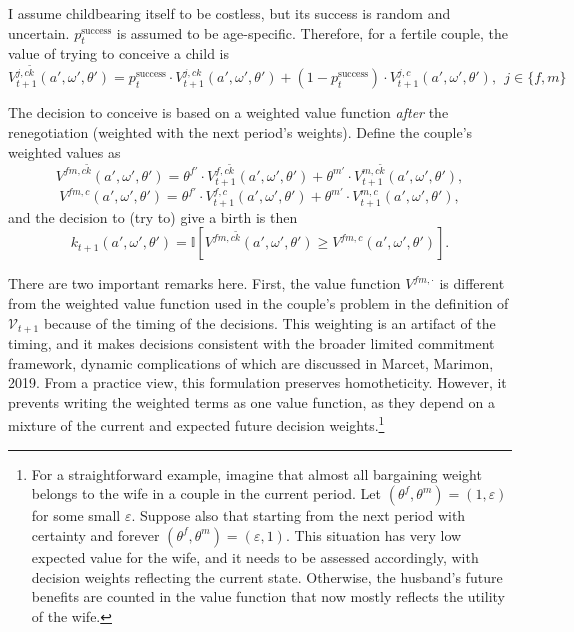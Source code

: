\documentclass[12pt,letter]{article}
\newcommand{\I}{\mathbb{I}}
\begin{document}
I assume childbearing itself to be costless, but its success is random and uncertain. $p_t^{\text{success}}$ is assumed to be age-specific. Therefore, for a fertile couple, the value of trying to conceive a child is
\begin{equation}
V^{j,c\tilde{k}}_{t+1}(a',\omega',\theta') = p_t^{\text{success}}\cdot V^{j,ck}_{t+1}(a',\omega',\theta') + (1-p_t^{\text{success}})\cdot V^{j,c}_{t+1}(a',\omega',\theta'), \ \ j\in\{f,m\}
\end{equation}

The decision to conceive is based on a weighted value function \emph{after} the renegotiation (weighted with the next period's weights). Define the couple's weighted values as
\[V^{fm,c\tilde{k}}(a',\omega',\theta') = \theta^{f\prime} \cdot V^{f,c\tilde{k}}_{t+1}(a',\omega',\theta') + \theta^{m\prime} \cdot V^{m,c\tilde{k}}_{t+1}(a',\omega',\theta'),\]
\[V^{fm,c}(a',\omega',\theta') = \theta^{f\prime} \cdot V^{f,c}_{t+1}(a',\omega',\theta') + \theta^{m\prime} \cdot V^{m,c}_{t+1}(a',\omega',\theta'),\]
and the decision to (try to) give a birth is then
\begin{equation}k_{t+1}(a',\omega',\theta') = \I\left[ V^{fm,c\tilde{k}}(a',\omega',\theta')  \geq V^{fm,c}(a',\omega',\theta')\right].\end{equation}

There are two important remarks here. First, the value function $V^{fm,\cdot}$ is different from the weighted value function used in the couple's problem in the definition of $\mathcal{V}_{t+1}$ because of the timing of the decisions. This weighting is an artifact of the timing, and it makes decisions consistent with the broader limited commitment framework, dynamic complications of which are discussed in Marcet, Marimon, 2019. From a practice view, this formulation preserves homotheticity. However, it prevents writing the weighted terms as one value function, as they depend on a mixture of the current and expected future decision weights.\footnote{For a straightforward example, imagine that almost all bargaining weight belongs to the wife in a couple in the current period. Let $(\theta^f,\theta^m) = (1,\varepsilon)$ for some small $\varepsilon$. Suppose also that starting from the next period with certainty and forever $(\theta^f,\theta^m) = (\varepsilon,1)$. This situation has very low expected value for the wife, and it needs to be assessed accordingly, with decision weights reflecting the current state. Otherwise, the husband's future benefits are counted in the value function that now mostly reflects the utility of the wife.}
\end{document}
